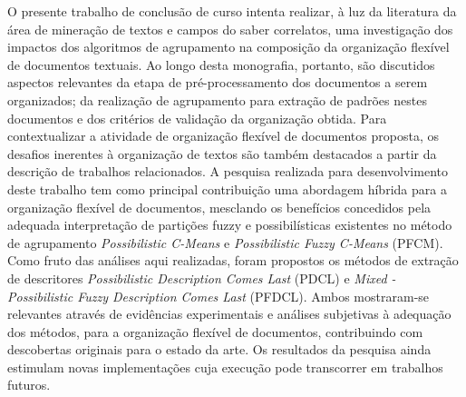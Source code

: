 O presente trabalho de conclusão de curso intenta realizar, à luz da literatura da área de mineração
de textos e campos do saber correlatos, uma investigação dos impactos dos algoritmos de agrupamento
na composição da organização flexível de documentos textuais. Ao longo desta monografia, portanto,
são discutidos aspectos relevantes da etapa de pré-processamento dos documentos a serem organizados;
da realização de agrupamento para extração de padrões nestes documentos e dos critérios de validação
da organização obtida. Para contextualizar a atividade de organização flexível de documentos
proposta, os desafios inerentes à organização de textos são também destacados a partir da descrição
de trabalhos relacionados.  A pesquisa realizada para desenvolvimento deste trabalho tem como
principal contribuição uma abordagem híbrida para a organização flexível de documentos, mesclando os
benefícios concedidos pela adequada interpretação de partições fuzzy e possibilísticas existentes no
método de agrupamento {\it Possibilistic C-Means} e {\it Possibilistic Fuzzy C-Means} (PFCM). Como
fruto das análises aqui realizadas, foram propostos os métodos de extração de descritores {\it
Possibilistic Description Comes Last} (PDCL) e {\it Mixed - Possibilistic Fuzzy Description Comes
Last} (PFDCL). Ambos mostraram-se relevantes através de evidências experimentais e análises
subjetivas à adequação dos métodos, para a organização flexível de documentos, contribuindo com
descobertas originais para o estado da arte. Os resultados da pesquisa ainda estimulam novas
implementações cuja execução pode transcorrer em trabalhos futuros.

